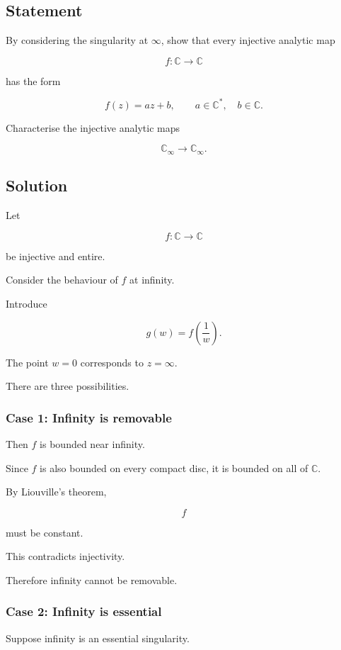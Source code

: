 \documentclass[12pt,a4paper]{article}
\theoremstyle{notespace}
\begin{document}
\subsection*{Statement}

By considering the singularity at \(\infty\), show that every injective analytic map

\[
f:\mathbb C\to\mathbb C
\]

has the form

\[
f(z)=az+b,
\qquad
a\in\mathbb C^\ast,
\quad
b\in\mathbb C.
\]

Characterise the injective analytic maps

\[
\mathbb C_\infty\to\mathbb C_\infty.
\]

\subsection*{Solution}

Let

\[
f:\mathbb C\to\mathbb C
\]

be injective and entire.

Consider the behaviour of \(f\) at infinity.

Introduce

\[
g(w)
=
f\!\left(\frac1w\right).
\]

The point \(w=0\) corresponds to \(z=\infty\).

There are three possibilities.

\subsubsection*{Case 1: Infinity is removable}

Then \(f\) is bounded near infinity.

Since \(f\) is also bounded on every compact disc, it is bounded on all of \(\mathbb C\).

By Liouville's theorem,

\[
f
\]

must be constant.

This contradicts injectivity.

Therefore infinity cannot be removable.

\subsubsection*{Case 2: Infinity is essential}

Suppose infinity is an essential singularity.
\end{document}
